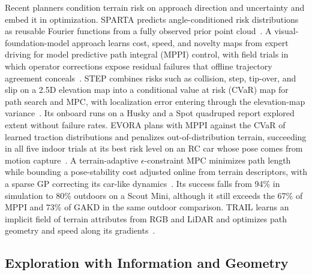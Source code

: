 Recent planners condition terrain risk on approach direction and uncertainty and embed it in optimization. SPARTA predicts angle-conditioned risk distributions as reusable Fourier functions from a fully observed prior point cloud~\cite{P_S45}. A visual-foundation-model approach learns cost, speed, and novelty maps from expert driving for model predictive path integral (MPPI) control, with field trials in which operator corrections expose residual failures that offline trajectory agreement conceals~\cite{P_S42}. STEP combines risks such as collision, step, tip-over, and slip on a 2.5D elevation map into a conditional value at risk (CVaR) map for path search and MPC, with localization error entering through the elevation-map variance~\cite{P_K03}. Its onboard runs on a Husky and a Spot quadruped report explored extent without failure rates. EVORA plans with MPPI against the CVaR of learned traction distributions and penalizes out-of-distribution terrain, succeeding in all five indoor trials at its best risk level on an RC car whose pose comes from motion capture~\cite{P_K05}. A terrain-adaptive $\epsilon$-constraint MPC minimizes path length while bounding a pose-stability cost adjusted online from terrain descriptors, with a sparse GP correcting its car-like dynamics~\cite{P_R13}. Its success falls from 94\% in simulation to 80\% outdoors on a Scout Mini, although it still exceeds the 67\% of MPPI and 73\% of GAKD in the same outdoor comparison. TRAIL learns an implicit field of terrain attributes from RGB and LiDAR and optimizes path geometry and speed along its gradients~\cite{P_R15}.

\subsection{Exploration with Information and Geometry}

